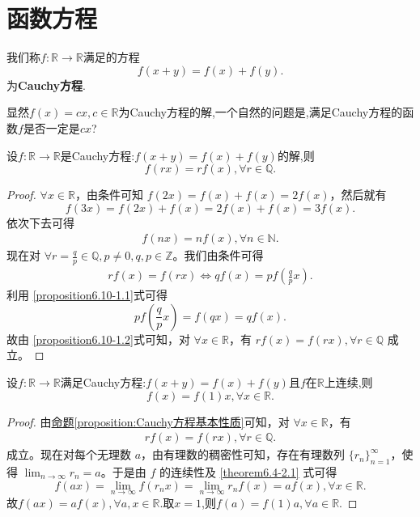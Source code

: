 \documentclass[../../main.tex]{subfiles}%
\begin{document}
\section{函数方程}

\begin{definition}
我们称\(f:\mathbb{R}\to\mathbb{R}\)满足的方程
\[
f(x + y)=f(x)+f(y).
\]
为\textbf{Cauchy方程}.
\end{definition}
\begin{note}
显然\(f(x)=cx,c\in\mathbb{R}\)为Cauchy方程的解,一个自然的问题是,满足Cauchy方程的函数\(f\)是否一定是\(cx\)?
\end{note}

\begin{proposition}[Cauchy方程基本性质]\label{proposition:Cauchy方程基本性质}
设\(f:\mathbb{R}\to\mathbb{R}\)是Cauchy方程:$f(x + y)=f(x)+f(y)$的解,则
\[
f(rx)=rf(x),\forall r\in\mathbb{Q}.
\]
\end{proposition}
\begin{proof}

\(\forall x\in \mathbb{R}\)，由条件可知 \(f(2x)=f(x)+f(x)=2f(x)\)，然后就有
\[
f(3x)=f(2x)+f(x)=2f(x)+f(x)=3f(x).
\]
依次下去可得
\begin{align}
f(nx)=nf(x),\forall n\in \mathbb{N}. \label{proposition6.10-1.1}
\end{align}
现在对 \(\forall r = \frac{q}{p}\in \mathbb{Q},p\neq 0,q,p\in \mathbb{Z}\)。我们由条件可得
\begin{align}
rf(x)=f(rx)\Leftrightarrow qf(x)=pf\left(\frac{q}{p}x\right).\label{proposition6.10-1.2}
\end{align}
利用 \eqref{proposition6.10-1.1}式可得
\[
pf\left(\frac{q}{p}x\right)=f(qx)=qf(x).
\]
故由 \eqref{proposition6.10-1.2}式可知，对 \(\forall x\in \mathbb{R}\)，有 \(rf(x)=f(rx),\forall r\in \mathbb{Q}\) 成立。

\end{proof}

\begin{theorem}\label{theorem:Cauchy方程加上连续性就能得到解是线性函数}
设\(f:\mathbb{R}\to\mathbb{R}\)满足Cauchy方程:$f(x + y)=f(x)+f(y)$且$f$在$\mathbb{R}$上连续,则
\[
f(x)=f(1)x,\forall x\in\mathbb{R}.
\]
\end{theorem}
\begin{proof}

由\hyperref[proposition:Cauchy方程基本性质]{命题\ref{proposition:Cauchy方程基本性质}}可知，对 \(\forall x\in \mathbb{R}\)，有
\begin{align}
rf(x)=f(rx),\forall r\in \mathbb{Q}. \label{theorem6.4-2.1}  
\end{align}
成立。现在对每个无理数 \(a\)，由有理数的稠密性可知，存在有理数列 \(\{r_n\}_{n = 1}^{\infty}\)，使得 \(\lim_{n\rightarrow \infty}r_n=a\)。于是由 \(f\) 的连续性及 \eqref{theorem6.4-2.1} 式可得
\[
f(ax)=\lim_{n\rightarrow \infty}f(r_nx)=\lim_{n\rightarrow \infty}r_nf(x)=af(x),\forall x\in \mathbb{R}.
\]
故$f(ax)=af(x),\forall a,x\in\mathbb{R}$.取$x=1$,则$f(a)=f(1)a,\forall a\in\mathbb{R}.$

\end{proof}
\end{document}
